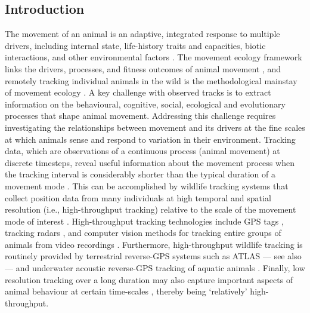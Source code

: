 \begin{refsection}
    \section*{Introduction}
    The movement of an animal is an adaptive, integrated response to multiple drivers, including internal state, life-history traits and capacities, biotic interactions, and other environmental factors \cite{nathan2008a, holyoak2008}.
    The movement ecology framework links the drivers, processes, and fitness outcomes of animal movement \cite{nathan2008a}, and remotely tracking individual animals in the wild is the methodological mainstay of movement ecology \cite{wikelski2007,nathan2008a,hussey2015,kays2015}.
    A key challenge with observed tracks is to extract information on the behavioural, cognitive, social, ecological and evolutionary processes that shape animal movement.
    Addressing this challenge requires investigating the relationships between movement and its drivers at the fine scales at which animals sense and respond to variation in their environment. 
    Tracking data, which are observations of a continuous process (animal movement) at discrete timesteps, reveal useful information about the movement process when the tracking interval is considerably shorter than the typical duration of a movement mode \cite{nathan2008a, noonan2019, getz2008}.
    This can be accomplished by wildlife tracking systems that collect position data from many individuals at high temporal and spatial resolution (i.e., high-throughput tracking) relative to the scale of the movement mode of interest \cite{getz2008}.
    High-throughput tracking technologies include GPS tags \cite{strandburg-peshkin2015, papageorgiou2019, harel2016, klarevas-irby2021}, tracking radars \cite{horvitz2014}, and computer vision methods for tracking entire groups of animals from video recordings \cite{rathore2020, perez-escudero2014}. 
    Furthermore, high-throughput wildlife tracking is routinely provided by terrestrial reverse-GPS systems such as ATLAS \cite[Advanced Tracking and Localization of Animals in real-life Systems:][]{toledo2014, weiser2016, toledo2016,toledo2020} --- see also \cite{maccurdy2009, maccurdy2019} --- and underwater acoustic reverse-GPS tracking of aquatic animals \cite{baktoft2019, baktoft2017, jung2015, aspillaga2021, aspillaga2021a}.
    Finally, low resolution tracking over a long duration may also capture important aspects of animal behaviour at certain time-scales \cite[e.g. migration, long-range dispersal;][]{getz2008}, thereby being `relatively' high-throughput.


\end{refsection}
